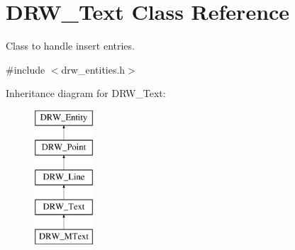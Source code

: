 \hypertarget{class_d_r_w___text}{}\section{D\+R\+W\+\_\+\+Text Class Reference}
\label{class_d_r_w___text}


Class to handle insert entries.  




{\ttfamily \#include $<$drw\+\_\+entities.\+h$>$}

Inheritance diagram for D\+R\+W\+\_\+\+Text\+:\begin{figure}[H]
\begin{center}
\leavevmode
\includegraphics[height=5.000000cm]{d9/d65/class_d_r_w___text}
\end{center}
\end{figure}
